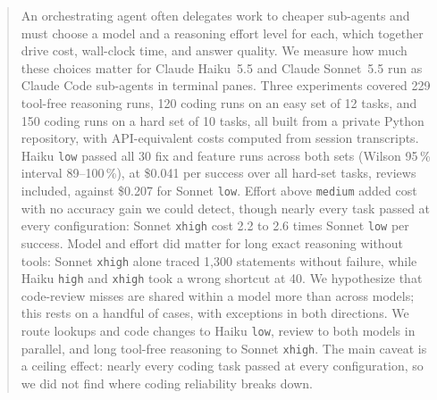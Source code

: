 \begin{abstract}
An orchestrating agent often delegates work to cheaper sub-agents and must choose a model and a reasoning effort level for each, which together drive cost, wall-clock time, and answer quality. We measure how much these choices matter for Claude Haiku~5.5 and Claude Sonnet~5.5 run as Claude Code sub-agents in terminal panes. Three experiments covered 229 tool-free reasoning runs, 120 coding runs on an easy set of 12 tasks, and 150 coding runs on a hard set of 10 tasks, all built from a private Python repository, with API-equivalent costs computed from session transcripts. Haiku \texttt{low} passed all 30 fix and feature runs across both sets (Wilson 95\,\% interval 89--100\,\%), at \$0.041 per success over all hard-set tasks, reviews included, against \$0.207 for Sonnet \texttt{low}. Effort above \texttt{medium} added cost with no accuracy gain we could detect, though nearly every task passed at every configuration: Sonnet \texttt{xhigh} cost 2.2 to 2.6 times Sonnet \texttt{low} per success. Model and effort did matter for long exact reasoning without tools: Sonnet \texttt{xhigh} alone traced 1,300 statements without failure, while Haiku \texttt{high} and \texttt{xhigh} took a wrong shortcut at 40. We hypothesize that code-review misses are shared within a model more than across models; this rests on a handful of cases, with exceptions in both directions. We route lookups and code changes to Haiku \texttt{low}, review to both models in parallel, and long tool-free reasoning to Sonnet \texttt{xhigh}. The main caveat is a ceiling effect: nearly every coding task passed at every configuration, so we did not find where coding reliability breaks down.
\end{abstract}
